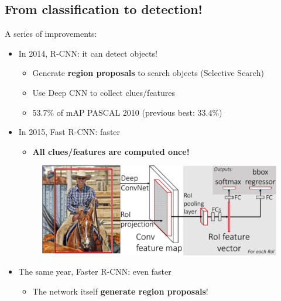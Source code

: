 \documentclass{beamer}[10pt, usepdftitle=false, handout]
\begin{document}
	\subsection{From classification to detection!}    
    \begin{frame}
		
	A series of improvements:
	\vspace*{1em}		
		
	\begin{itemize}
	\item{
	In 2014, R-CNN: it can detect objects!
	\begin{itemize}
		\item{Generate \textbf{region proposals} to search objects (Selective Search)}			
		\item{Use Deep CNN to collect clues/features}
		\item{53.7\% of mAP PASCAL 2010 (previous best: 33.4\%)\newline}
	\end{itemize}

	
	
	}
	\item{	
	In 2015, Fast R-CNN: faster
	\begin{itemize}
		\item{\textbf{All clues/features are computed once!}\newline}
	\end{itemize}	
	\begin{figure}
				\includegraphics[scale=0.3]{32.png} 
			\end{figure}	
		    
    }
    \item{
    The same year, Faster R-CNN: even faster
	\begin{itemize}
		\item{The network itself \textbf{generate region proposals}!\newline}
	\end{itemize}
	}
	\end{itemize}

	\end{frame} 	    
	    
\end{document}
